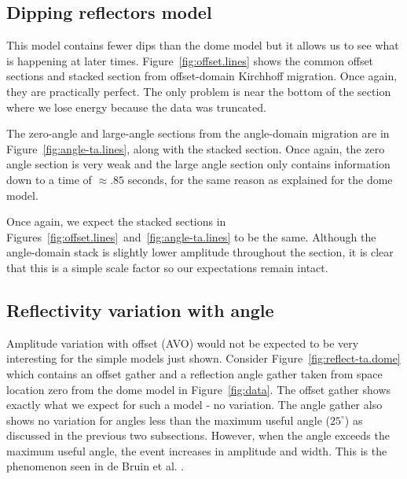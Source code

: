

\par
\subsection{Dipping reflectors model}

This model contains fewer dips than the dome model but it allows us to 
see what is happening at later times.  Figure~\ref{fig:offset.lines} 
shows the common offset sections  and stacked section from offset-domain 
Kirchhoff migration.  Once again, they are practically perfect.  The only 
problem is near the bottom of the section where we lose energy because the
data was truncated.

The zero-angle and large-angle sections from the angle-domain migration are
in Figure~\ref{fig:angle-ta.lines}, along with the stacked section.  Once 
again, the zero angle section is very weak and the large angle section only
contains information down to a time of $\approx .85$ seconds, for the same
reason as explained for the dome model.  

Once again, we expect the stacked sections in 
Figures~\ref{fig:offset.lines}~and~\ref{fig:angle-ta.lines} to be the same. 
Although the angle-domain stack is slightly lower amplitude throughout the
section, it is clear that this is a simple scale factor so our expectations
remain intact. 



\par
\subsection{Reflectivity variation with angle}

Amplitude variation with offset (AVO) would not be expected to be very
interesting for the simple models just shown.  Consider  
Figure~\ref{fig:reflect-ta.dome} which contains an offset gather and a 
reflection angle gather taken from space location zero from the dome model in
Figure~\ref{fig:data}.  The offset gather shows exactly what we expect 
for such a model - no variation.  The angle gather also shows no variation
      for angles less than the maximum useful angle ($25^{\circ}$) as discussed in the
previous two subsections.  However, when the angle exceeds the maximum useful
angle, the event increases in amplitude and width.  This is the phenomenon
seen in de Bruin et al. . 

